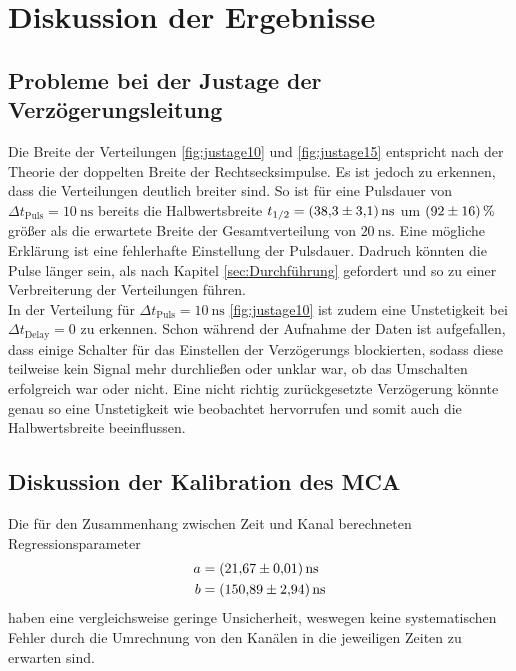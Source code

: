 \section{Diskussion der Ergebnisse}
\label{sec:Diskussion}

\subsection{Probleme bei der Justage der Verzögerungsleitung}
Die Breite der Verteilungen \ref{fig:justage10} und \ref{fig:justage15} entspricht 
nach der Theorie der doppelten Breite der Rechtsecksimpulse.
Es ist jedoch zu erkennen, dass die Verteilungen deutlich breiter sind. So ist für eine Pulsdauer
von $\Delta t_\text{Puls}=\SI{10}{\nano\second}$ bereits die Halbwertsbreite 
$t_{1/2}=\SI{38.3\pm 3.1}{\nano\second}$ um $\SI{92\pm 16}{\percent}$
größer als die erwartete Breite der Gesamtverteilung von $\SI{20}{\nano\second}$.
Eine mögliche Erklärung ist eine fehlerhafte Einstellung der Pulsdauer. Dadruch könnten 
die Pulse länger sein, als nach Kapitel \ref{sec:Durchführung} gefordert und so zu einer 
Verbreiterung der Verteilungen führen.
\\
In der Verteilung für $\Delta t_{\text{Puls}}=\SI{10}{\nano\second}$ \ref{fig:justage10} ist zudem eine 
Unstetigkeit bei $\Delta t_\text{Delay}=0$ zu erkennen. Schon während der Aufnahme der Daten ist aufgefallen, 
dass einige Schalter für das Einstellen der Verzögerungs blockierten, sodass diese teilweise kein Signal mehr 
durchließen oder unklar war, ob das Umschalten erfolgreich war oder nicht. Eine nicht richtig zurückgesetzte 
Verzögerung könnte genau so eine Unstetigkeit wie beobachtet hervorrufen und somit auch die Halbwertsbreite
beeinflussen.

\subsection{Diskussion der Kalibration des MCA}
Die für den Zusammenhang zwischen Zeit und Kanal berechneten Regressionsparameter 
\begin{align*}
    a &= \SI{21.67 \pm 0.01}{\nano\second} \\ 
    b &= \SI{150.89 \pm 2.94}{\nano\second}
 \end{align*}
haben eine vergleichsweise geringe Unsicherheit, weswegen keine systematischen Fehler durch die Umrechnung von den Kanälen in die jeweiligen Zeiten zu erwarten sind. 

